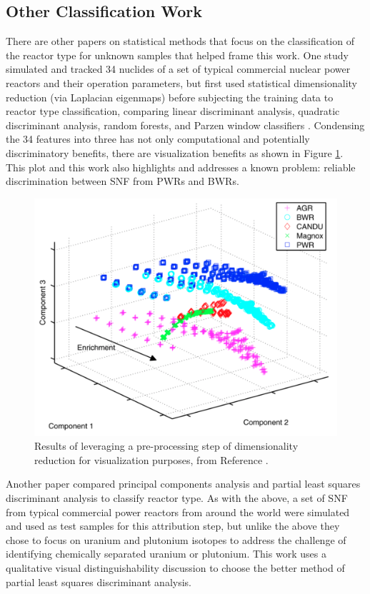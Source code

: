 \subsection{Other Classification Work}

There are other papers on statistical methods that focus on the classification
of the reactor type for unknown samples that helped frame this work.  One study
simulated and tracked 34 nuclides of a set of typical commercial nuclear power
reactors and their operation parameters, but first used statistical
dimensionality reduction (via Laplacian eigenmaps) before subjecting the
training data to reactor type classification, comparing linear discriminant
analysis, quadratic discriminant analysis, random forests, and Parzen window
classifiers \cite{jones_snf_2014}.  Condensing the 34 features into three has
not only computational and potentially discriminatory benefits, there are
visualization benefits as shown in Figure \ref{fig:jones}.  This plot and this
work also highlights and addresses a known problem: reliable discrimination
between \gls{SNF} from \glspl{PWR} and \glspl{BWR}. 

\begin{figure}[!htb]
  \centering
  \includegraphics[width=0.7\linewidth]{./chapters/litrev/jones.png}
  \caption[Example of dimensionality reduction for visualization]
          {Results of leveraging a pre-processing step of dimensionality 
           reduction for visualization purposes, from Reference 
           \cite{jones_snf_2014}.}
  \label{fig:jones}
\end{figure}

Another paper compared principal components analysis and partial least squares
discriminant analysis to classify reactor type. As with the above, a set of
\gls{SNF} from typical commercial power reactors from around the world were
simulated and used as test samples for this attribution step, but unlike the
above they chose to focus on uranium and plutonium isotopes to address the
challenge of identifying chemically separated uranium or plutonium. This work
uses a qualitative visual distinguishability discussion to choose the better
method of partial least squares discriminant analysis.

